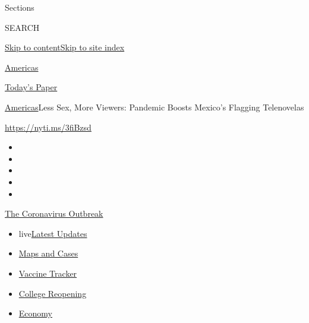 Sections

SEARCH

\protect\hyperlink{site-content}{Skip to
content}\protect\hyperlink{site-index}{Skip to site index}

\href{https://www.nytimes.com/section/world/americas}{Americas}

\href{https://myaccount.nytimes.com/auth/login?response_type=cookie\&client_id=vi}{}

\href{https://www.nytimes.com/section/todayspaper}{Today's Paper}

\href{/section/world/americas}{Americas}\textbar{}Less Sex, More
Viewers: Pandemic Boosts Mexico's Flagging Telenovelas

\url{https://nyti.ms/3fiBzsd}

\begin{itemize}
\item
\item
\item
\item
\item
\end{itemize}

\href{https://www.nytimes.com/news-event/coronavirus?action=click\&pgtype=Article\&state=default\&region=TOP_BANNER\&context=storylines_menu}{The
Coronavirus Outbreak}

\begin{itemize}
\tightlist
\item
  live\href{https://www.nytimes.com/2020/08/04/world/coronavirus-cases.html?action=click\&pgtype=Article\&state=default\&region=TOP_BANNER\&context=storylines_menu}{Latest
  Updates}
\item
  \href{https://www.nytimes.com/interactive/2020/us/coronavirus-us-cases.html?action=click\&pgtype=Article\&state=default\&region=TOP_BANNER\&context=storylines_menu}{Maps
  and Cases}
\item
  \href{https://www.nytimes.com/interactive/2020/science/coronavirus-vaccine-tracker.html?action=click\&pgtype=Article\&state=default\&region=TOP_BANNER\&context=storylines_menu}{Vaccine
  Tracker}
\item
  \href{https://www.nytimes.com/2020/08/02/us/covid-college-reopening.html?action=click\&pgtype=Article\&state=default\&region=TOP_BANNER\&context=storylines_menu}{College
  Reopening}
\item
  \href{https://www.nytimes.com/live/2020/08/04/business/stock-market-today-coronavirus?action=click\&pgtype=Article\&state=default\&region=TOP_BANNER\&context=storylines_menu}{Economy}
\end{itemize}

